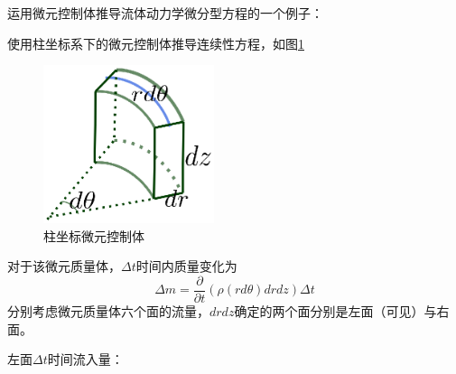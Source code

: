 
运用微元控制体推导流体动力学微分型方程的一个例子：

使用柱坐标系下的微元控制体推导连续性方程，如图\ref{fig:61D}
\begin{figure}[!ht]
 \centering
 \includegraphics[width=5cm]{differentialControlElement.eps}
 \caption{柱坐标微元控制体}\label{fig:61D}
\end{figure}

对于该微元质量体，$\Delta t$时间内质量变化为
\begin{equation}\label{eq:61cm}
\Delta m = \frac{\partial}{\partial t}(\rho (rd\theta) dr dz)\Delta t
\end{equation}
分别考虑微元质量体六个面的流量，$drdz$确定的两个面分别是左面（可见）与右面。

左面$\Delta t$时间流入量：

